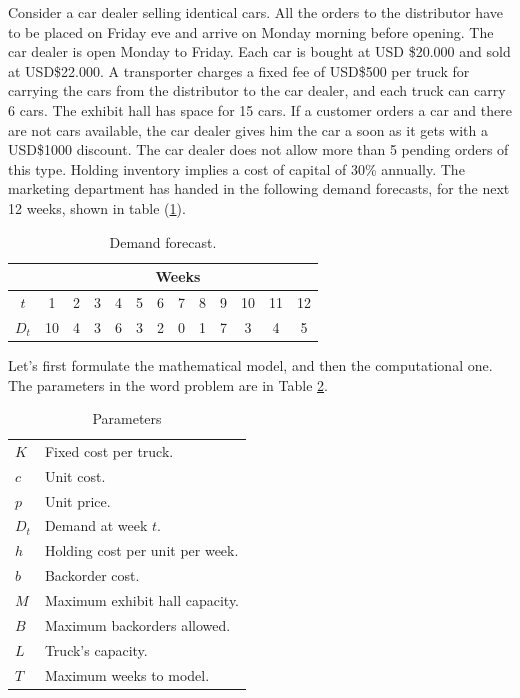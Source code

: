 \documentclass[11pt]{article}
\begin{document}
Consider a car dealer selling identical cars. All the orders to the distributor have to be placed on Friday eve and arrive on Monday morning before opening. The car dealer is open Monday to Friday. Each car is bought at USD \$20.000 and sold at USD\$22.000. A transporter charges a fixed fee of USD\$500 per truck for carrying the cars from the distributor to the car dealer, and each truck can carry 6 cars. The exhibit hall has space for 15 cars. If a customer orders a car and there are not cars available, the car dealer gives him the car a soon as it gets with a USD\$1000 discount. The car dealer does not allow more than 5 pending orders of this type. Holding inventory implies a cost of capital of 30\% annually. The marketing department has handed in the following demand forecasts, for the next 12 weeks, shown in table (\ref{tab:demands}).

\begin{table}[htb]  \centering
\begin{tabular}{|c|c|c|c|c|c|c|c|c|c|c|c|c|}
\hline
\multicolumn{1}{|c|}{} & \multicolumn{12}{|c|}{Weeks}\\
\hline
$t$&1&2&3&4&5&6&7&8&9&10&11&12\\
\hline
$D_t$&10& 4& 3& 6& 3& 2& 0& 1& 7& 3& 4& 5  \\
\hline
\end{tabular}
\caption{Demand forecast.}\label{tab:demands}
\end{table}

Let's first formulate the mathematical model, and then the computational one. The parameters in the word problem are in Table \ref{tab:parameters1}.

\begin{table}[ht]
\begin{center}
\begin{tabular}{ll}
$K$ & Fixed cost per truck.\\
$c$ & Unit cost.\\
$p$ & Unit price.\\
$D_t$ & Demand at week $t$.\\
$h$ & Holding cost per unit per week.\\
$b$ & Backorder cost.\\
$M$ & Maximum exhibit hall capacity.\\
$B$ & Maximum backorders allowed.\\
$L$ & Truck's capacity.\\
$T$ & Maximum weeks to model.
\end{tabular}
\caption[\textbf{Parameters:}]{Parameters}
\label{tab:parameters1}
\end{center}
\end{table}
\end{document}
